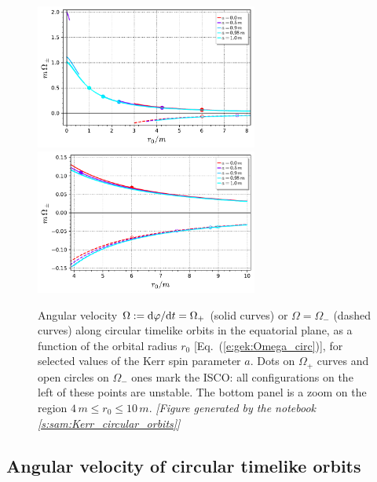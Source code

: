 \begin{figure}
\begin{center}
\includegraphics[width=0.65\textwidth]{gek_omega_circ_orb.pdf}\\
\includegraphics[width=0.65\textwidth]{gek_omega_circ_orb_zoom.pdf}
\end{center}
\caption[]{\label{f:gek:omega_circ_orb} \footnotesize
Angular velocity $\Omega:=\mathrm{d}\varphi/\mathrm{d} t=\Omega_+$ (solid curves) or $\Omega=\Omega_-$
(dashed curves) along circular timelike
orbits in the equatorial plane, as a function of the orbital radius $r_0$
[Eq.~(\ref{e:gek:Omega_circ})], for selected values of the Kerr spin parameter $a$.
Dots on $\Omega_+$ curves and open circles on $\Omega_-$ ones mark the ISCO: all
configurations on the left of these points are unstable.
The bottom panel is a zoom on the region $4\,m \leq r_0 \leq 10\,m$.
\textsl{[Figure generated by the notebook \ref{s:sam:Kerr_circular_orbits}]}
}
\end{figure}

\subsection{Angular velocity of circular timelike orbits}

